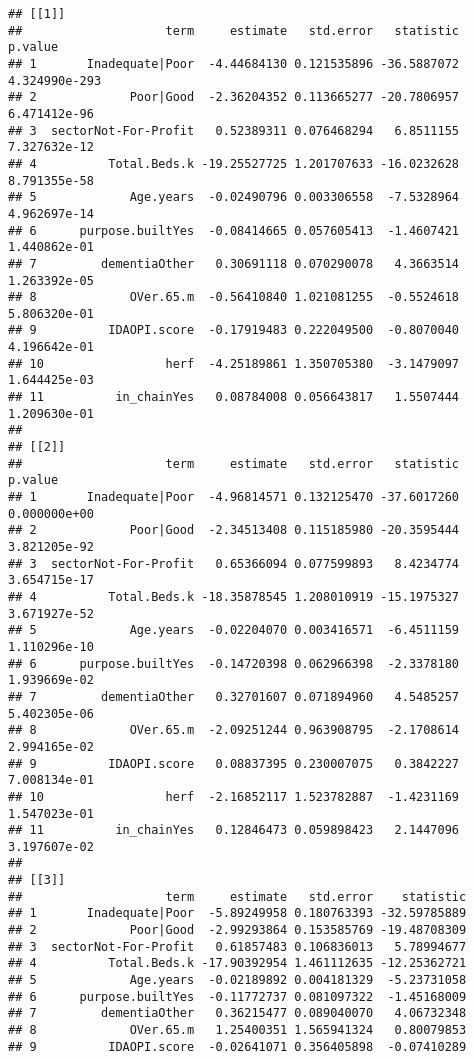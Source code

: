 \documentclass[]{article}
\begin{document}
\begin{verbatim}
## [[1]]
##                    term     estimate   std.error   statistic       p.value
## 1       Inadequate|Poor  -4.44684130 0.121535896 -36.5887072 4.324990e-293
## 2             Poor|Good  -2.36204352 0.113665277 -20.7806957  6.471412e-96
## 3  sectorNot-For-Profit   0.52389311 0.076468294   6.8511155  7.327632e-12
## 4          Total.Beds.k -19.25527725 1.201707633 -16.0232628  8.791355e-58
## 5             Age.years  -0.02490796 0.003306558  -7.5328964  4.962697e-14
## 6      purpose.builtYes  -0.08414665 0.057605413  -1.4607421  1.440862e-01
## 7         dementiaOther   0.30691118 0.070290078   4.3663514  1.263392e-05
## 8             OVer.65.m  -0.56410840 1.021081255  -0.5524618  5.806320e-01
## 9          IDAOPI.score  -0.17919483 0.222049500  -0.8070040  4.196642e-01
## 10                 herf  -4.25189861 1.350705380  -3.1479097  1.644425e-03
## 11          in_chainYes   0.08784008 0.056643817   1.5507444  1.209630e-01
## 
## [[2]]
##                    term     estimate   std.error   statistic      p.value
## 1       Inadequate|Poor  -4.96814571 0.132125470 -37.6017260 0.000000e+00
## 2             Poor|Good  -2.34513408 0.115185980 -20.3595444 3.821205e-92
## 3  sectorNot-For-Profit   0.65366094 0.077599893   8.4234774 3.654715e-17
## 4          Total.Beds.k -18.35878545 1.208010919 -15.1975327 3.671927e-52
## 5             Age.years  -0.02204070 0.003416571  -6.4511159 1.110296e-10
## 6      purpose.builtYes  -0.14720398 0.062966398  -2.3378180 1.939669e-02
## 7         dementiaOther   0.32701607 0.071894960   4.5485257 5.402305e-06
## 8             OVer.65.m  -2.09251244 0.963908795  -2.1708614 2.994165e-02
## 9          IDAOPI.score   0.08837395 0.230007075   0.3842227 7.008134e-01
## 10                 herf  -2.16852117 1.523782887  -1.4231169 1.547023e-01
## 11          in_chainYes   0.12846473 0.059898423   2.1447096 3.197607e-02
## 
## [[3]]
##                    term     estimate   std.error    statistic
## 1       Inadequate|Poor  -5.89249958 0.180763393 -32.59785889
## 2             Poor|Good  -2.99293864 0.153585769 -19.48708309
## 3  sectorNot-For-Profit   0.61857483 0.106836013   5.78994677
## 4          Total.Beds.k -17.90392954 1.461112635 -12.25362721
## 5             Age.years  -0.02189892 0.004181329  -5.23731058
## 6      purpose.builtYes  -0.11772737 0.081097322  -1.45168009
## 7         dementiaOther   0.36215477 0.089040070   4.06732348
## 8             OVer.65.m   1.25400351 1.565941324   0.80079853
## 9          IDAOPI.score  -0.02641071 0.356405898  -0.07410289

\end{verbatim}
\end{document}
